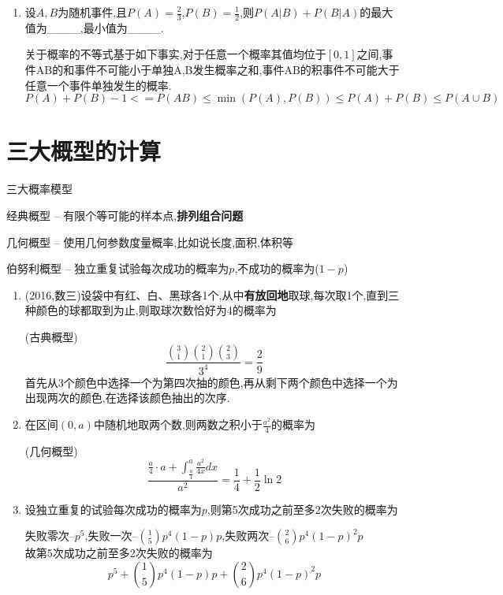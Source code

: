 \documentclass[12pt, a4paper, oneside, UTF8]{ctexbook}
\begin{document}
\begin{enumerate}[label=\arabic*.]
    \item 设$A,B$为随机事件,且$P(A)=\frac{2}{3}$,$P(B)=\frac{1}{2}$,则$P(A|B)+P(B|A)$的最大值为\_\_\_\_,最小值为\_\_\_\_.
    
    \begin{solution}
    关于概率的不等式基于如下事实,对于任意一个概率其值均位于$[0,1]$之间,事件AB的和事件不可能小于单独A,B发生概率之和,事件AB的积事件不可能大于
    任意一个事件单独发生的概率.
    \[
    P(A)+P(B) - 1<=P(AB) \leq \min{(P(A),P(B))}  \leq P(A) + P(B) \leq P(A\cup B) 
    \]
    \end{solution}
\end{enumerate}

\section{三大概型的计算}
\begin{remark}
    三大概率模型
    \item 经典概型 -- 有限个等可能的样本点,\textbf{排列组合问题}
    \item 几何概型 -- 使用几何参数度量概率,比如说长度,面积,体积等
    \item 伯努利概型 -- 独立重复试验每次成功的概率为$p$,不成功的概率为($1-p$)
\end{remark}
\begin{enumerate}[label=\arabic*.,start=6]
    \item (2016,数三)设袋中有红、白、黑球各1个,从中\textbf{有放回地}取球,每次取1个,直到三种颜色的球都取到为止,则取球次数恰好为4的概率为
    
    \begin{solution}
    (古典概型) 
    \[\frac{\binom{3}{1}\binom{2}{1}\binom{2}{3}}{3^4}=\frac{2}{9}\]
    首先从3个颜色中选择一个为第四次抽的颜色,再从剩下两个颜色中选择一个为出现两次的颜色,在选择该颜色抽出的次序.
    \end{solution}
    \item 在区间$(0,a)$中随机地取两个数,则两数之积小于$\frac{a^2}{4}$的概率为
    
    \begin{solution}
    (几何概型)
    \[
    \frac{\frac{a}{4}\cdot a + \int_{\frac{a}{4}}^{a}\frac{a^2}{4x}dx}{a^2} = \frac{1}{4} + \frac{1}{2}\ln{2}
    \]
    \end{solution}
    \item 设独立重复的试验每次成功的概率为$p$,则第5次成功之前至多2次失败的概率为
    
    \begin{solution}
    失败零次--$p^5$,失败一次--$\binom{1}{5}p^4(1-p)p$,失败两次--$\binom{2}{6}p^4(1-p)^2p$ \\
    故第5次成功之前至多2次失败的概率为
    \[
    p^5 + \binom{1}{5}p^4(1-p)p + \binom{2}{6}p^4(1-p)^2p
    \]
    \end{solution}
\end{enumerate}
\end{document}
